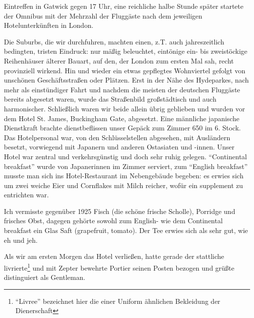 \documentclass[a5paper,pagesize,10pt,twoside=true]{scrbook}
\begin{document}
Eintreffen in Gatwick gegen 17 Uhr, eine reichliche halbe Stunde später startete der Omnibus mit der Mehrzahl der Fluggäste nach dem jeweiligen Hotelunterkünften in London.

Die Suburbs, die wir durchfuhren, machten einen, z.T. auch jahreszeitlich bedingten, tristen Eindruck: nur mäßig beleuchtet, eintönige ein- bis zweistöckige Reihenhäuser älterer Bauart, auf den, der London zum ersten Mal sah, recht provinziell wirkend. Hin und wieder ein etwas gepflegtes Wohnviertel gefolgt von unschönen Geschäftsstraßen oder Plätzen. Erst in der Nähe des Hydeparkes, nach mehr als einstündiger Fahrt und nachdem die meisten der deutschen Fluggäste bereits abgesetzt waren, wurde das Straßenbild großstädtisch und auch harmonischer. Schließlich waren wir beide allein übrig geblieben und wurden vor dem Hotel St. James, Buckingham Gate, abgesetzt. Eine männliche japanische Dienstkraft brachte dienstbeflissen unser Gepäck zum Zimmer 650 im 6. Stock. Das Hotelpersonal war, von den Schlüsselstellen abgesehen, mit Ausländern besetzt, vorwiegend mit Japanern und anderen Ostasiaten und -innen. Unser Hotel war zentral und verkehrsgünstig und doch sehr ruhig gelegen. \enquote{Continental breakfast} wurde von Japanerinnen im Zimmer serviert, zum \enquote{English breakfast} musste man sich ins Hotel-Restaurant im Nebengebäude begeben: es erwies sich um zwei weiche Eier und Cornflakes mit Milch reicher, wofür ein supplement zu entrichten war.

Ich vermisste gegenüber 1925 Fisch (die schöne frische Scholle), Porridge und frisches Obst, dagegen gehörte sowohl zum English- wie dem Continental breakfast ein Glas Saft (grapefruit, tomato). Der Tee erwies sich als sehr gut, wie eh und jeh.

Als wir am ersten Morgen das Hotel verließen, hatte gerade der stattliche livrierte\footnote{\enquote{Livree} bezeichnet hier die einer Uniform ähnlichen Bekleidung der Dienerschaft} und mit Zepter bewehrte Portier seinen Posten bezogen und grüßte distinguiert als Gentleman.
\end{document}
